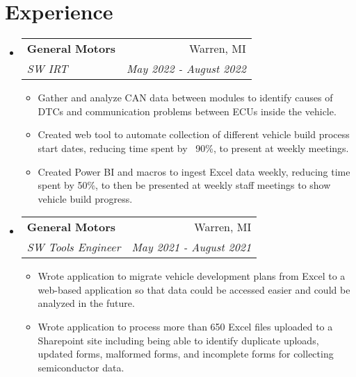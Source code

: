 \documentclass[letterpaper,10.8pt]{article}
\makeatletter
\newcommand{\resumeSubheading}[4]{
  \vspace{-1pt}\item
    \begin{tabular*}{0.97\textwidth}{l@{\extracolsep{\fill}}r}
      \textbf{#1} & #2 \\
      \textit{\small#3} & \textit{\small #4} \\
    \end{tabular*}\vspace{-5pt}
}
\newcommand{\resumeSubHeadingListStart}{\begin{itemize}[leftmargin=*]}
\newcommand{\resumeSubHeadingListEnd}{\end{itemize}}
\newcommand{\resumeItemListStart}{\begin{itemize}}
\newcommand{\resumeItemListEnd}{\end{itemize}\vspace{-5pt}}
\makeatother
\begin{document}
\section{Experience}
  \resumeSubHeadingListStart
    \resumeSubheading
    {General Motors}{Warren, MI}
    {SW IRT }{May 2022  -  August 2022}
    \resumeItemListStart
        \item Gather and analyze CAN data between modules to identify causes of DTCs and communication problems between ECUs inside the vehicle.
        \item Created web tool to automate collection of different vehicle build process start dates, reducing time spent by ~90\%, to present at weekly meetings.
        \item Created Power BI and macros to ingest Excel data weekly, reducing time spent by 50\%, to then be presented at weekly staff meetings to show vehicle build progress.
      \resumeItemListEnd
    \resumeSubheading
		{General Motors}{Warren, MI}
        {SW Tools Engineer }{May 2021  -  August 2021}
		\resumeItemListStart
        \item Wrote application to migrate vehicle development plans from Excel to a web-based application so that data could be accessed easier and could be analyzed in the future.
        \item Wrote application to process more than 650 Excel files uploaded to a Sharepoint site including being able to identify duplicate uploads, updated forms, malformed forms, and incomplete forms for collecting semiconductor data.
		\resumeItemListEnd 
\resumeSubHeadingListEnd

\end{document}
